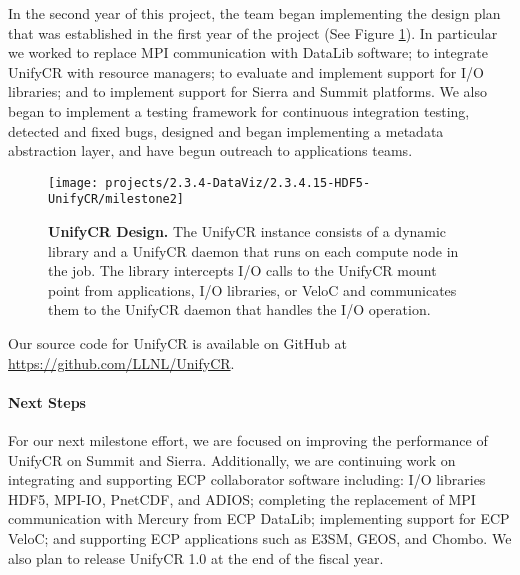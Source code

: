 In the second year of this project, the team began
implementing the design plan that was established in the first
year of the project (See Figure \ref{fig:milestone2}). In particular
we worked to replace MPI communication with DataLib software; to integrate
UnifyCR with resource managers; to evaluate and implement support for I/O 
libraries; and to implement support for Sierra and Summit platforms.
We also began to implement a testing framework for continuous integration
testing, detected and fixed bugs, designed and began implementing a 
metadata abstraction layer, and have begun outreach to applications teams.
\begin{figure}[htb]
        \centering
        \texttt{[image: projects/2.3.4-DataViz/2.3.4.15-HDF5-UnifyCR/milestone2]}
        \caption{\label{fig:milestone2} \textbf{UnifyCR Design.} The UnifyCR
instance consists of a dynamic library and a UnifyCR daemon that runs
on each compute node in the job. The library intercepts I/O calls to
the UnifyCR mount point from applications, I/O libraries, or VeloC and communicates them to the UnifyCR daemon that handles the I/O operation.}
\end{figure}


Our source code for UnifyCR is available on 
GitHub at \url{https://github.com/LLNL/UnifyCR}. 
\paragraph{Next Steps}

For our next milestone effort, we are focused on improving the performance
of UnifyCR on Summit and Sierra. Additionally, we are continuing work on 
integrating and supporting ECP collaborator software including:
I/O libraries HDF5, MPI-IO, PnetCDF, and ADIOS; completing the replacement
of MPI communication with Mercury from ECP DataLib; implementing
support for ECP VeloC; and supporting ECP applications such as
E3SM, GEOS, and Chombo.
We also plan to release UnifyCR 1.0 at the end of the fiscal year.

